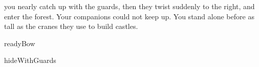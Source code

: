 you nearly catch up with the \glspl{guard}, then they twist suddenly to the right, and enter the forest.
Your companions could not keep up.
You stand alone before  as tall as the cranes they use to build castles.

\begin{selectPath}
  {}%
  {readyBow}

  {}%
  {hideWithGuards}
\end{selectPath}

